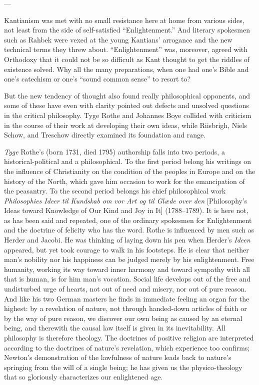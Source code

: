 \documentclass[12pt,a4paper]{book}
\newcommand{\opage}[1]{\marginnote{\footnotesize\textit{[#1]}}}
\begin{document}
\begin{center}---\end{center}

Kantianism was met with no small resistance here at home from various sides, not
least from the side of self-satisfied ``Enlightenment.'' And literary spokesmen
such as Rahbek were vexed at the young Kantians' arrogance and the new technical
terms they threw about. ``Enlightenment'' was, moreover, agreed with Orthodoxy
that it could not be so difficult as Kant thought to get the riddles of existence
solved. Why all the many preparations, when one had one's Bible and one's catechism
or one's ``sound common sense'' to resort to?

But the new tendency of thought also found really philosophical opponents, and some
of these have even with clarity pointed out defects and unsolved questions in the
critical philosophy. Tyge Rothe and Johannes Boye collided with criticism in the
course of their work at developing their own ideas, while Riisbrigh, Niels Schow,
and Treschow directly examined its foundation and range.

\emph{Tyge} Rothe's (born 1731, died 1795) authorship falls into two periods, a
historical-political and a philosophical. To the first period belong his writings
on the influence of Christianity on the condition of the peoples in Europe and on
the history of the North, which gave him occasion to work for the emancipation of
the peasantry. To the second period belongs his chief philosophical work
\emph{Philosophies Ideer til Kundskab om vor Art og til Glæde over den}
[Philosophy's Ideas toward Knowledge of Our \opage{31}Kind and Joy in It] (1788--1789). It is
here not, as has been said and repeated, one of the ordinary spokesmen for
Enlightenment and the doctrine of felicity who has the word. Rothe is influenced by
men such as Herder and Jacobi. He was thinking of laying down his pen when Herder's
\emph{Ideen} appeared, but yet took courage to walk in his footsteps. He is clear
that neither man's nobility nor his happiness can be judged merely by his
enlightenment. Free humanity, working its way toward inner harmony and toward
sympathy with all that is human, is for him man's vocation. Social life develops
out of the free and undisturbed urge of hearts, not out of need and misery, nor out
of pure reason. And like his two German masters he finds in immediate feeling an
organ for the highest: by a revelation of nature, not through handed-down articles
of faith or by the way of pure reason, we discover our own being as caused by an
eternal being, and therewith the causal law itself is given in its inevitability.
All philosophy is therefore theology. The doctrines of positive religion are
interpreted according to the doctrines of nature's revelation, which experience too
confirms; Newton's demonstration of the lawfulness of nature leads back to nature's
springing from the will of a single being; he has given us the physico-theology
that so gloriously characterizes our enlightened age.
\end{document}
